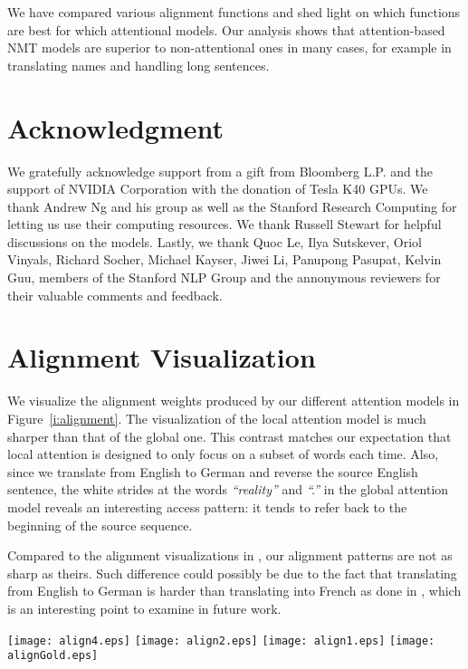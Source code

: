 \documentclass[11pt,a4paper]{article}
\begin{document}
We have compared various alignment functions and shed light on which functions
are best for which attentional models.
Our analysis shows that attention-based NMT models are superior to
non-attentional ones in many cases, for example in translating names and
handling long
sentences.
 
\section*{Acknowledgment}
We gratefully acknowledge support from a gift from Bloomberg L.P.
and the support of NVIDIA Corporation with the donation of Tesla K40 GPUs.
We thank Andrew Ng and his group as well as the Stanford Research
Computing for letting us use their computing
resources.
We thank Russell Stewart for helpful discussions on the 
models. Lastly, we thank Quoc Le, Ilya Sutskever, Oriol Vinyals,
Richard Socher, Michael Kayser, Jiwei Li, Panupong Pasupat, Kelvin
Guu, members of the Stanford NLP Group and the annonymous reviewers for their valuable comments and feedback.



\appendix
\section{Alignment Visualization}
\label{sec:visual}
We visualize the alignment weights produced by our different attention
models in Figure~\ref{i:alignment}. The visualization of the local
attention model is much sharper than that of the global one. This contrast matches
our expectation that local attention is designed to only focus on a subset of
words each time. Also, since we
translate from English to German and reverse the source English sentence, the white strides
at the words {\it ``reality''} and {\it ``.''} in the global attention model reveals an
interesting access pattern: it tends to refer back to the beginning of the
source sequence. 

Compared to the alignment visualizations in \cite{bog15}, our
alignment patterns are not as sharp as theirs. Such difference could possibly be due to
the fact that translating from English to German is
harder than translating into French as done in \cite{bog15},
which is an interesting point to examine in future work.




\begin{figure*}
  \begin{center}
    \texttt{[image: align4.eps]}
    \texttt{[image: align2.eps]}
    \texttt{[image: align1.eps]}
    \texttt{[image: alignGold.eps]}
  \end{center}
  \caption{{\bf Alignment visualizations} -- shown are images of the attention
  weights learned by various models: (top left) global, (top right)
  local-m, and (bottom left) local-p. The {\it gold} alignments are
  displayed at the bottom right corner.
  }
  \label{i:alignment}
\end{figure*}
\end{document}
